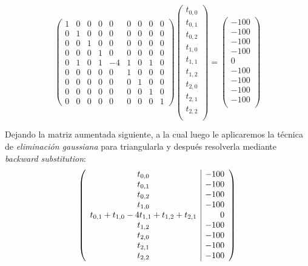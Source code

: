 $$
\left( \begin{array}{ccccccccc}
1 & 0 & 0 & 0 & 0 & 0 & 0 & 0 & 0 \\
0 & 1 & 0 & 0 & 0 & 0 & 0 & 0 & 0 \\
0 & 0 & 1 & 0 & 0 & 0 & 0 & 0 & 0 \\ 
0 & 0 & 0 & 1 & 0 & 0 & 0 & 0 & 0 \\
0 & 1 & 0 & 1 & -4 & 1 & 0 & 1 & 0 \\
0 & 0 & 0 & 0 & 0 & 1 & 0 & 0 & 0 \\ 
0 & 0 & 0 & 0 & 0 & 0 & 1 & 0 & 0 \\
0 & 0 & 0 & 0 & 0 & 0 & 0 & 1 & 0 \\
0 & 0 & 0 & 0 & 0 & 0 & 0 & 0 & 1
\end{array} \right)	\left( \begin{array}{c}
t_{0,0} \\
t_{0,1} \\
t_{0,2} \\
t_{1,0} \\
t_{1,1} \\
t_{1,2} \\
t_{2,0} \\
t_{2,1} \\
t_{2,2} \\
\end{array} \right) = \left( \begin{array}{c}
-100 \\
-100 \\
-100 \\
-100 \\
0 \\
-100 \\
-100 \\
-100 \\
-100 \\
\end{array} \right)
$$
\par
Dejando la matriz aumentada siguiente, a la cual luego le aplicaremos la técnica de \textit{eliminación gaussiana} para triangularla y después resolverla mediante \textit{backward substitution}:
\vspace{\baselineskip}
$$
\left( \begin{array}{c | r}
t_{0,0} & -100\\
t_{0,1} & -100\\
t_{0,2} & -100 \\
t_{1,0} & -100\\
t_{0,1} + t_{1,0} - 4t_{1,1} + t_{1,2} + t_{2,1} & 0\\
t_{1,2} & -100\\
t_{2,0} & -100\\
t_{2,1} & -100\\
t_{2,2} & -100\\
\end{array} \right)
$$

